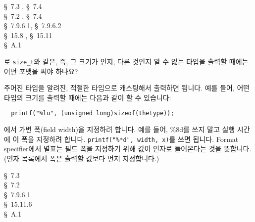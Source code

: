 \begin{faq}
\R
	\cite{kr1} \S\ 7.3 , \S\ 7.4  \\
	\cite{kr2} \S\ 7.2 , \S\ 7.4  \\
	\cite{c89} \S\ 7.9.6.1,	\S\ 7.9.6.2 \\
	\cite{hs} \S\ 15.8 , \S\ 15.11  \\
	\cite{ctp} \S\ A.1 
\end{faq}

\begin{faq}
	로 \verb+size_t+와 같은, 즉, 그 크기가 인지,
	다른 것인지 알 수 없는  타입을 출력할 때에는
	어떤 포맷을 써야 하나요? 

\A
	주어진 타입을 알려진, 적절한 타입으로 캐스팅해서 출력하면 됩니다.
	예를 들어, 어떤 타입의 크기를 출력할 때에는 다음과 같이 할 수 있습니다:
\begin{verbatim}
  printf("%lu", (unsigned long)sizeof(thetype));
\end{verbatim}
\end{faq}

\begin{faq}
	에서 가변 폭(field width)을 지정하려 합니다.
	예를 들어, \%8d를 쓰지 말고 실행 시간에 이 폭을 지정하려 합니다.
\A
	\verb+printf("%*d", width, x)+를 쓰면 됩니다.
	Format specifier에서 별표는 필드 폭을 지정하기 위해  값이
	인자로 들어온다는 것을 뜻합니다. (인자 목록에서 폭은 출력할 값보다
	먼저 지정합니다.) 


\R
	\cite{kr1} \S\ 7.3 \\
	\cite{kr2} \S\ 7.2 \\
	\cite{c89} \S\ 7.9.6.1 \\
	\cite{hs} \S\ 15.11.6 \\
	\cite{ctp} \S\ A.1
\end{faq}


